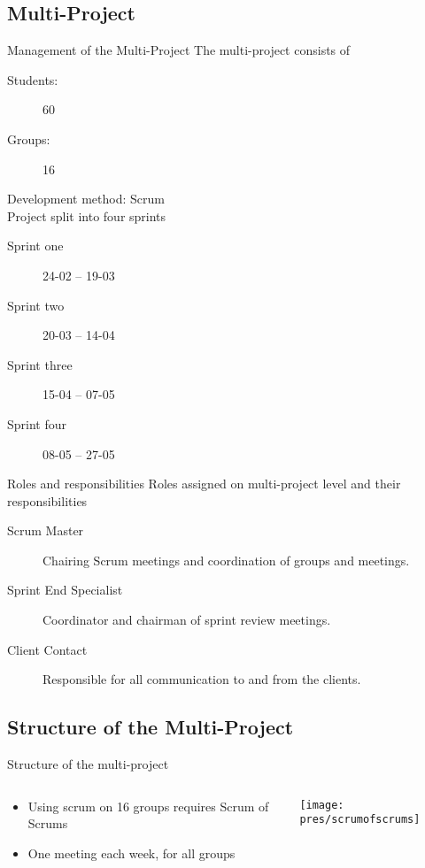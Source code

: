 \subsection{Multi-Project}
\begin{frame}{Management of the Multi-Project}
	The multi-project consists of
	\begin{description}
		\item[Students:]{60}
		\item[Groups:]{16}
	\end{description}
\pause
	Development method: Scrum\\
	{Project split into four sprints}
	\begin{description}
			\item[Sprint one] 24-02 -- 19-03 
			\item[Sprint two] 20-03 -- 14-04
			\item[Sprint three] 15-04 -- 07-05
			\item[Sprint four] 08-05 -- 27-05
	\end{description}
\end{frame}

\begin{frame}{Roles and responsibilities}
	Roles assigned on multi-project level and their responsibilities
	\begin{description}
		\item[Scrum Master] Chairing Scrum meetings and coordination of groups and meetings.
		\item[Sprint End Specialist] Coordinator and chairman of sprint review meetings.
		\item[Client Contact] Responsible for all communication to and from the clients.
	\end{description}
\end{frame}

\subsection{Structure of the Multi-Project}
\begin{frame}{Structure of the multi-project}
\begin{columns}
\begin{column}{.38\textwidth}
\begin{itemize}
\item Using scrum on 16 groups requires Scrum of Scrums
\item One meeting each week, for all groups
\end{itemize}
\end{column}
\begin{column}{.58\textwidth}
\texttt{[image: pres/scrumofscrums]}
\end{column}
\end{columns}
\end{frame}

